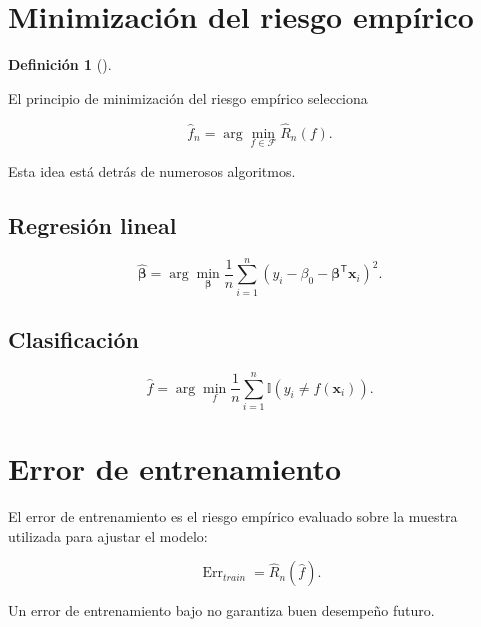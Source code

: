 \documentclass[
  spanish,
  10.5pt,
  letterpaper,
  DIV=11,
  numbers=noendperiod,
  oneside,
  open=any]{scrreprt}
\theoremstyle{definition}
\newtheorem{definition}{Definición}[chapter]
\theoremstyle{definition}
\theoremstyle{plain}
\theoremstyle{remark}
\begin{document}
\section*{Minimización del riesgo
empírico}\label{minimizaciuxf3n-del-riesgo-empuxedrico}


\begin{definition}[]\protect\hypertarget{def-erm}{}\label{def-erm}

El principio de minimización del riesgo empírico selecciona

\[
\widehat{f}_n
=
\arg\min_{f\in\mathcal{F}}
\widehat{R}_n(f).
\]

\end{definition}

Esta idea está detrás de numerosos algoritmos.

\subsection*{Regresión lineal}\label{regresiuxf3n-lineal}

\[
\widehat{\boldsymbol{\beta}}
=
\arg\min_{\boldsymbol{\beta}}
\frac{1}{n}
\sum_{i=1}^{n}
(
y_i
-
\beta_0
-
\boldsymbol{\beta}^{\mathsf T}\mathbf{x}_i
)^2.
\]

\subsection*{Clasificación}\label{clasificaciuxf3n}

\[
\widehat{f}
=
\arg\min_f
\frac{1}{n}
\sum_{i=1}^{n}
\mathbb{I}
(
y_i\neq f(\mathbf{x}_i)
).
\]

\section*{Error de entrenamiento}\label{error-de-entrenamiento}


El error de entrenamiento es el riesgo empírico evaluado sobre la
muestra utilizada para ajustar el modelo:

\[
\operatorname{Err}_{train}
=
\widehat{R}_n(\widehat{f}).
\]

Un error de entrenamiento bajo no garantiza buen desempeño futuro.
\end{document}
